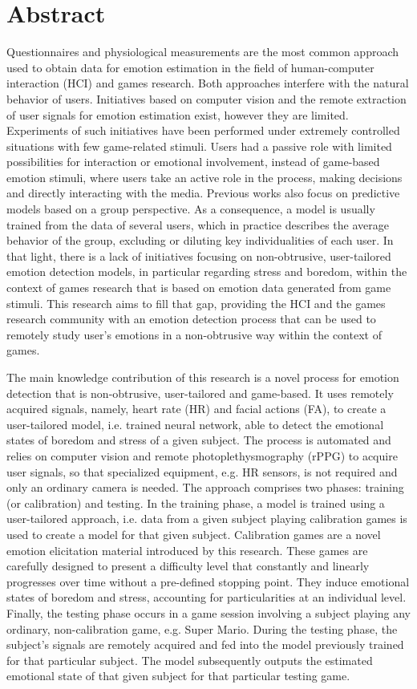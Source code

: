 \chapter*{Abstract}

Questionnaires and physiological measurements are the most common approach used to obtain data for emotion estimation in the field of human-computer interaction (HCI) and games research. Both approaches interfere with the natural behavior of users. Initiatives based on computer vision and the remote extraction of user signals for emotion estimation exist, however they are limited. Experiments of such initiatives have been performed under extremely controlled situations with few game-related stimuli. Users had a passive role with limited possibilities for interaction or emotional involvement, instead of game-based emotion stimuli, where users take an active role in the process, making decisions and directly interacting with the media. Previous works also focus on predictive models based on a group perspective. As a consequence, a model is usually trained from the data of several users, which in practice describes the average behavior of the group, excluding or diluting key individualities of each user. In that light, there is a lack of initiatives focusing on non-obtrusive, user-tailored emotion detection models, in particular regarding stress and boredom, within the context of games research that is based on emotion data generated from game stimuli. This research aims to fill that gap, providing the HCI and the games research community with an emotion detection process that can be used to remotely study user's emotions in a non-obtrusive way within the context of games.

The main knowledge contribution of this research is a novel process for emotion detection that is non-obtrusive, user-tailored and game-based. It uses remotely acquired signals, namely, heart rate (HR) and facial actions (FA), to create a user-tailored model, i.e. trained neural network, able to detect the emotional states of boredom and stress of a given subject. The process is automated and relies on computer vision and remote photoplethysmography (rPPG) to acquire user signals, so that specialized equipment, e.g. HR sensors, is not required and only an ordinary camera is needed. The approach comprises two phases: training (or calibration) and testing. In the training phase, a model is trained using a user-tailored approach, i.e. data from a given subject playing calibration games is used to create a model for that given subject. Calibration games are a novel emotion elicitation material introduced by this research. These games are carefully designed to present a difficulty level that constantly and linearly progresses over time without a pre-defined stopping point. They induce emotional states of boredom and stress, accounting for particularities at an individual level. Finally, the testing phase occurs in a game session involving a subject playing any ordinary, non-calibration game, e.g. Super Mario. During the testing phase, the subject's signals are remotely acquired and fed into the model previously trained for that particular subject. The model subsequently outputs the estimated emotional state of that given subject for that particular testing game.

